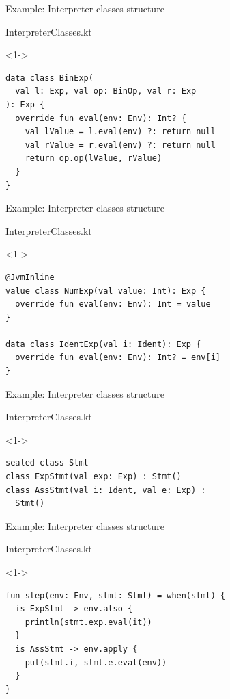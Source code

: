\documentclass[hyperref={pdfpagelabels=false},xcolor={dvipsnames},compress]{beamer}
\begin{document}
    \begin{frame}[fragile]{Example: Interpreter classes structure}
        \begin{exampleblock}{InterpreterClasses.kt}
            \begin{onlyenv}<1->
                \begin{lstlisting}
data class BinExp(
  val l: Exp, val op: BinOp, val r: Exp
): Exp {
  override fun eval(env: Env): Int? {
    val lValue = l.eval(env) ?: return null
    val rValue = r.eval(env) ?: return null
    return op.op(lValue, rValue)
  }
}
                \end{lstlisting}
            \end{onlyenv}
        \end{exampleblock}
    \end{frame}

    \begin{frame}[fragile]{Example: Interpreter classes structure}
        \begin{exampleblock}{InterpreterClasses.kt}
            \begin{onlyenv}<1->
                \begin{lstlisting}
@JvmInline
value class NumExp(val value: Int): Exp {
  override fun eval(env: Env): Int = value
}

data class IdentExp(val i: Ident): Exp {
  override fun eval(env: Env): Int? = env[i]
}
                \end{lstlisting}
            \end{onlyenv}
        \end{exampleblock}
    \end{frame}

    \begin{frame}[fragile]{Example: Interpreter classes structure}
        \begin{exampleblock}{InterpreterClasses.kt}
            \begin{onlyenv}<1->
                \begin{lstlisting}
sealed class Stmt
class ExpStmt(val exp: Exp) : Stmt()
class AssStmt(val i: Ident, val e: Exp) :
  Stmt()
                \end{lstlisting}
            \end{onlyenv}
        \end{exampleblock}
    \end{frame}

    \begin{frame}[fragile]{Example: Interpreter classes structure}
        \begin{exampleblock}{InterpreterClasses.kt}
            \begin{onlyenv}<1->
                \begin{lstlisting}
fun step(env: Env, stmt: Stmt) = when(stmt) {
  is ExpStmt -> env.also {
    println(stmt.exp.eval(it))
  }
  is AssStmt -> env.apply {
    put(stmt.i, stmt.e.eval(env))
  }
}
                \end{lstlisting}
            \end{onlyenv}
        \end{exampleblock}
    \end{frame}
\end{document}
